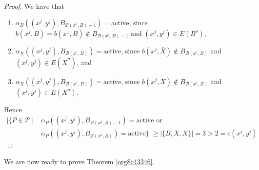 \documentclass[fontsize=11pt,paper=a4]{book}
\begin{document}
\begin{proof}
We have that

\begin{enumerate}
\item \(\alpha_B((x^j,y^j),B_{\mathcal{B}(x^1,B)-1})=\mathrm{active}\), since \(b(x^j,B)=b(x^1,B)\notin B_{\mathcal{B}(x^1,B)-1}\) and \((x^j,y^j)\in E(B^o)\),

\item \(\alpha_{\bar{X}}((x^j,y^j),B_{\mathcal{B}(x^1,B)})=\mathrm{active}\), since \(b(x^j,\bar{X})\notin B_{\mathcal{B}(x^1,B)}\) and \((x^j,y^j)\in E(\bar{X}^u)\), and

\item \(\alpha_{X}((x^j,y^j),B_{\mathcal{B}(x^1,B)})=\mathrm{active}\), since \(b(x^j,X)\notin B_{\mathcal{B}(x^1,B)}\) and \((x^j,y^j)\in E(X^u)\).
\end{enumerate}

Hence
\begin{align*}
\lvert\{P\in\mathcal{P}\mid&\alpha_P((x^j,y^j),B_{\mathcal{B}(x^1,B)-1})=\mathrm{active}\text{ or }\\
&\alpha_P((x^j,y^j),B_{\mathcal{B}(x^1,B)})=\mathrm{active}\}\rvert\geq\lvert\{B,\bar{X},X\}\rvert=3>2=c(x^j,y^j)
\end{align*}
\end{proof}

We are now ready to prove Theorem \ref{org8c43346}.
\end{document}
